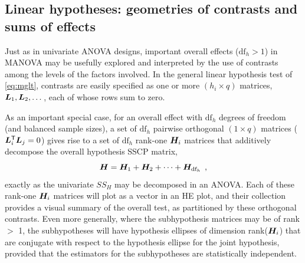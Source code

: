 \subsection{Linear hypotheses: geometries of contrasts and sums of effects}

Just as in univariate ANOVA designs, important overall effects ($\textrm{df}_h>1$) in MANOVA may be usefully
explored and interpreted by the use of contrasts among the levels of the factors involved.
In the general linear hypothesis test of \eqref{eq:mglt}, contrasts are easily specified as one or more $(h_i \times q)$ 
matrices, $\bm{L}_1, \bm{L}_2, \dots $, each of whose rows sum to zero.

As an important special case,
for an overall effect with
$\textrm{df}_h$ degrees of freedom (and balanced sample sizes), a set of $\textrm{df}_h$ pairwise orthogonal $(1 \times q)$
 matrices ($\bm{L}_i ^\mathsf{T} \bm{L}_j =0$) gives rise to a set of $\textrm{df}_h$ rank-one $\bm{H}_i$
matrices that additively decompose the overall hypothesis SSCP matrix,
\begin{equation*}
\bm{H} = \bm{H}_1 + \bm{H}_2 + \cdots + \bm{H}_{\textrm{df}_h}
\:\: ,
\end{equation*}
exactly as the univariate $SS_H$ may be decomposed in an ANOVA.  Each of these rank-one $\bm{H}_i$ matrices
will plot as a vector in an HE plot, and their collection provides a visual summary of the overall
test, as partitioned by these orthogonal contrasts.
Even more generally, where the subhypothesis matrices may be of rank $>$ 1,  the subhypotheses will have hypothesis ellipses of dimension rank($\bm{H}_i$)
that are conjugate with respect to the hypothesis ellipse for the joint hypothesis, provided that the
estimators for the subhypotheses are statistically independent.


